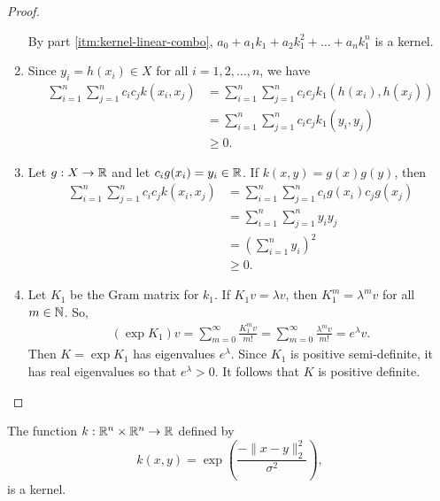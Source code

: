 \begin{proof}
\begin{enumerate}
        By part \ref{itm:kernel-linear-combo}, \(a_0 + a_1 k_1 + a_2 k_1^2 + \dots + a_n k_1^n\) is a kernel.
        \item Since \(y_i = h(x_i) \in X\) for all \(i = 1,2,\dots, n\), we have
        \begin{align*}
            \sum_{i=1}^{n} \sum_{j=1}^{n} c_i c_j k(x_i,x_j)
            &= \sum_{i=1}^{n} \sum_{j=1}^{n} c_i c_j k_1(h(x_i), h(x_j))\\
            &= \sum_{i=1}^{n} \sum_{j=1}^{n} c_i c_j k_1(y_i, y_j)\\
            &\geq 0.
        \end{align*}
        \item Let \(g : X \to \mathbb{R}\) and let \(c_i g(x_i) = y_i \in \mathbb{R}\).
        If \(k(x,y) = g(x)g(y)\), then
        \begin{align*}
            \sum_{i=1}^{n} \sum_{j=1}^{n} c_i c_j k(x_i,x_j)
            &= \sum_{i=1}^{n} \sum_{j=1}^{n} c_i g(x_i) c_j g(x_j)\\
            &= \sum_{i=1}^{n} \sum_{j=1}^{n} y_i y_j\\
            &= \left(\sum_{i=1}^{n} y_i\right)^2\\
            &\geq 0.
        \end{align*}
        \item Let \(K_1\) be the Gram matrix for \(k_1\).
        If \(K_1 v = \lambda v\), then \(K_1^m = \lambda^m v\) for all \(m \in \mathbb{N}\).
        So,
        \begin{align*}
            (\exp K_1) v
            = \sum_{m=0}^{\infty} \frac{K_1^m v}{m!}
            = \sum_{m=0}^{\infty} \frac{\lambda^m v}{m!}
            = e^\lambda v.
        \end{align*}
        Then \(K = \exp K_1\) has eigenvalues \(e^\lambda\).
        Since \(K_1\) is positive semi-definite, it has real eigenvalues so that \(e^\lambda > 0\).
        It follows that \(K\) is positive definite.
    \end{enumerate}
\end{proof}

\begin{theorem}
    The function \(k : \mathbb{R}^n \times \mathbb{R}^n \to \mathbb{R}\) defined by
    \[k(x,y) = \exp\left(\dfrac{-\|x-y\|^2_2}{\sigma^2}\right),\]
    is a kernel.
\end{theorem}